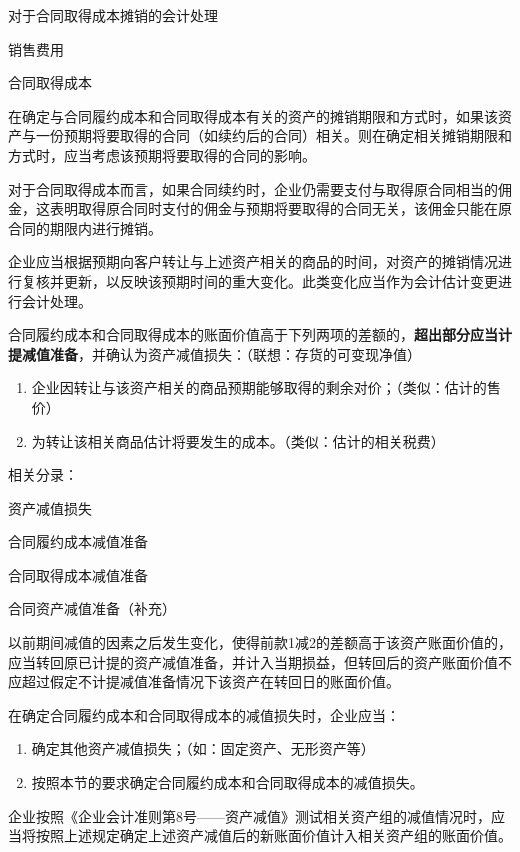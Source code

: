 \documentclass[UTF8,12pt]{ctexart}
\newenvironment{Dr}{%
	\begin{list}{}%
		{
			\setlength{\leftmargin}{2em}
			\setlength{\labelwidth}{2em}
			\setlength{\labelsep}{0pt}
			\setlength{\itemindent}{0pt}
			\setlength{\listparindent}{0pt}
			\setlength{\parsep}{0pt}
			\setlength{\topsep}{0pt}
		}
		\item[\textbf{借：}]
	}{%
	\end{list}
}
\newenvironment{Cr}{%
	\begin{list}{}%
		{
			\setlength{\leftmargin}{3em}
			\setlength{\labelwidth}{2em}
			\setlength{\labelsep}{0pt}
			\setlength{\itemindent}{0pt}
			\setlength{\listparindent}{0pt}
			\setlength{\parsep}{0pt}
			\setlength{\topsep}{0pt}
		}
		\item[\textbf{贷：}]
	}{%
	\end{list}
}
\numberwithin{equation}{section} %
\numberwithin{figure}{section}
\numberwithin{table}{section}
\begin{document}
	对于合同取得成本摊销的会计处理
	\begin{Dr}
		销售费用
	\end{Dr}
	\begin{Cr}
		合同取得成本
	\end{Cr}

	在确定与合同履约成本和合同取得成本有关的资产的摊销期限和方式时，如果该资产与一份预期将要取得的合同（如续约后的合同）相关。则在确定相关摊销期限和方式时，应当考虑该预期将要取得的合同的影响。
	
	对于合同取得成本而言，如果合同续约时，企业仍需要支付与取得原合同相当的佣金，这表明取得原合同时支付的佣金与预期将要取得的合同无关，该佣金只能在原合同的期限内进行摊销。
	
	企业应当根据预期向客户转让与上述资产相关的商品的时间，对资产的摊销情况进行复核并更新，以反映该预期时间的重大变化。此类变化应当作为会计估计变更进行会计处理。

	合同履约成本和合同取得成本的账面价值高于下列两项的差额的，\textbf{超出部分应当计提减值准备}，并确认为资产减值损失：（联想：存货的可变现净值）
	\begin{enumerate}
		\item 企业因转让与该资产相关的商品预期能够取得的剩余对价；（类似：估计的售价）
		
		\item 为转让该相关商品估计将要发生的成本。（类似：估计的相关税费）
	\end{enumerate}
	
	相关分录：
	\begin{Dr}
		资产减值损失
	\end{Dr}
	\begin{Cr}
		合同履约成本减值准备
		
		合同取得成本减值准备
		
		合同资产减值准备（补充） 
	\end{Cr}
	
	以前期间减值的因素之后发生变化，使得前款1减2的差额高于该资产账面价值的，应当转回原已计提的资产减值准备，并计入当期损益，但转回后的资产账面价值不应超过假定不计提减值准备情况下该资产在转回日的账面价值。

	在确定合同履约成本和合同取得成本的减值损失时，企业应当：
	\begin{enumerate}
		\item 确定其他资产减值损失；（如：固定资产、无形资产等）
		
		\item 按照本节的要求确定合同履约成本和合同取得成本的减值损失。
	\end{enumerate}
	企业按照《企业会计准则第8号——资产减值》测试相关资产组的减值情况时，应当将按照上述规定确定上述资产减值后的新账面价值计入相关资产组的账面价值。
	
\end{document}
